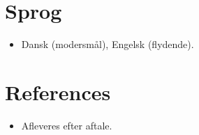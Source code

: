 \documentclass[11pt,a4paper,sans]{moderncv}
\begin{document}

\section{Sprog}
\vspace{1pt}
\begin{itemize}
\item Dansk (modersmål), Engelsk (flydende).
\end{itemize}


\section{References}
\vspace{1pt}
\begin{itemize}
\item{Afleveres efter aftale.}
\end{itemize}
\end{document}
